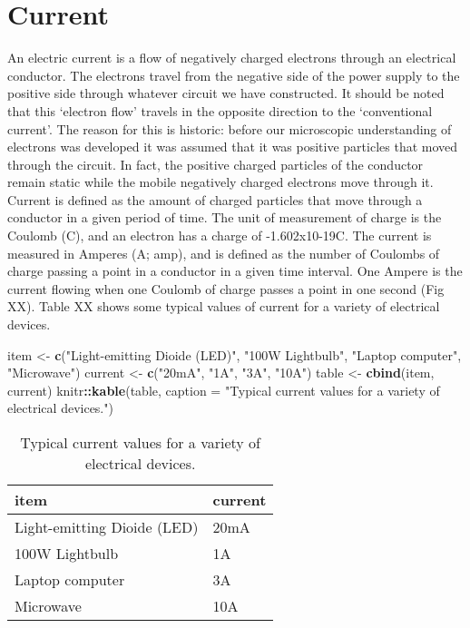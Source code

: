 \documentclass[
]{book}
\newenvironment{Shaded}{\begin{snugshade}}{\end{snugshade}}
\newcommand{\AttributeTok}[1]{\textcolor[rgb]{0.13,0.29,0.53}{#1}}
\newcommand{\FunctionTok}[1]{\textcolor[rgb]{0.13,0.29,0.53}{\textbf{#1}}}
\newcommand{\NormalTok}[1]{#1}
\newcommand{\OtherTok}[1]{\textcolor[rgb]{0.56,0.35,0.01}{#1}}
\newcommand{\SpecialCharTok}[1]{\textcolor[rgb]{0.81,0.36,0.00}{\textbf{#1}}}
\newcommand{\StringTok}[1]{\textcolor[rgb]{0.31,0.60,0.02}{#1}}
\begin{document}
\section{Current}\label{current}

An electric current is a flow of negatively charged electrons through an electrical conductor. The electrons travel from the negative side of the power supply to the positive side through whatever circuit we have constructed. It should be noted that this `electron flow' travels in the opposite direction to the `conventional current'. The reason for this is historic: before our microscopic understanding of electrons was developed it was assumed that it was positive particles that moved through the circuit. In fact, the positive charged particles of the conductor remain static while the mobile negatively charged electrons move through it.
Current is defined as the amount of charged particles that move through a conductor in a given period of time. The unit of measurement of charge is the Coulomb (C), and an electron has a charge of -1.602x10-19C. The current is measured in Amperes (A; amp), and is defined as the number of Coulombs of charge passing a point in a conductor in a given time interval. One Ampere is the current flowing when one Coulomb of charge passes a point in one second (Fig XX). Table XX shows some typical values of current for a variety of electrical devices.

\begin{Shaded}
\begin{Highlighting}[]
\NormalTok{item }\OtherTok{\textless{}{-}} \FunctionTok{c}\NormalTok{(}\StringTok{"Light{-}emitting Dioide (LED)"}\NormalTok{, }\StringTok{"100W Lightbulb"}\NormalTok{, }\StringTok{"Laptop computer"}\NormalTok{, }\StringTok{"Microwave"}\NormalTok{)}
\NormalTok{current }\OtherTok{\textless{}{-}} \FunctionTok{c}\NormalTok{(}\StringTok{"20mA"}\NormalTok{, }\StringTok{"1A"}\NormalTok{, }\StringTok{"3A"}\NormalTok{, }\StringTok{"10A"}\NormalTok{)}
\NormalTok{table }\OtherTok{\textless{}{-}} \FunctionTok{cbind}\NormalTok{(item, current)}
\NormalTok{knitr}\SpecialCharTok{::}\FunctionTok{kable}\NormalTok{(table, }\AttributeTok{caption =} \StringTok{"Typical current values for a variety of electrical devices."}\NormalTok{)}
\end{Highlighting}
\end{Shaded}

\begin{table}

\caption{\label{tab:unnamed-chunk-1}Typical current values for a variety of electrical devices.}
\centering
\begin{tabular}[t]{l|l}
\hline
item & current\\
\hline
Light-emitting Dioide (LED) & 20mA\\
\hline
100W Lightbulb & 1A\\
\hline
Laptop computer & 3A\\
\hline
Microwave & 10A\\
\hline
\end{tabular}
\end{table}
\end{document}

